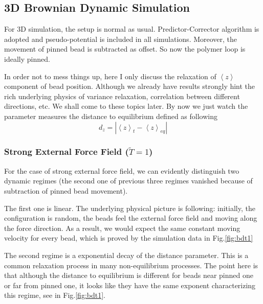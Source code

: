 \documentclass[12pt,a4paper]{article}
\begin{document}
\subsection{3D Brownian Dynamic Simulation}
For 3D simulation, the setup is normal as usual. Predictor-Corrector algorithm
is adopted and pseudo-potential is included in all simulations. Moreover,
the movement of pinned bead is subtracted as offset. So now the polymer loop is
ideally pinned. 

In order not to mess things up, here I only discuss the relaxation of
$\left<z\right>$ component of bead position. Although we already have results
strongly hint the rich underlying physics of variance relaxation, correlation
between different directions, etc. We shall come to these topics later. By now
we just watch the parameter measures the distance to equilibrium defined as
following
\begin{equation}
    d_z = |\left<z\right>_t - \left<z\right>_{eq}|
\end{equation}

\subsubsection{Strong External Force Field ($\tilde{T} = 1$)}
For the case of strong external force field, we can evidently distinguish two
dynamic regimes (the second one of previous three regimes vanished because of
subtraction of pinned bead movement). 

The first one is linear. The underlying physical picture is following:
initially, the configuration is random, the beads feel the external force field
and moving along the force direction. As a result, we would expect the same
constant moving velocity for every bead, which is proved by the simulation data
in Fig.\ref{fig:bdt1}

The second regime is a exponential decay of the distance parameter. This is a
common relaxation process in many non-equilibrium processes. The point here 
is that although the distance to equilibrium is different for beads near pinned
one or far from pinned one, it looks like they have the same exponent
characterizing this regime, see in Fig.\ref{fig:bdt1}.
\end{document}
